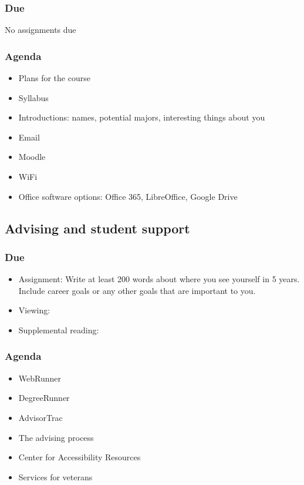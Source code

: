 \documentclass[12pt,article,oneside]{memoir}
\begin{document}
\subsubsection{Due}
No assignments due

\subsubsection{Agenda}
\begin{itemize}
 \item Plans for the course
 \item Syllabus
 \item Introductions: names, potential majors, interesting things about you
 \item Email
 \item Moodle
 \item WiFi
 \item Office software options: Office 365, LibreOffice, Google Drive
\end{itemize}


\subsection{Advising and student support}
\subsubsection{Due}
\begin{itemize}
 \item Assignment: Write at least 200 words about where you see yourself in 5 years.  Include career goals or any other goals that are important to you.
 \item Viewing: \cite{credits}
 \item Supplemental reading: 
\end{itemize}

\subsubsection{Agenda}
\begin{itemize}
\item WebRunner
\item DegreeRunner
\item AdvisorTrac
\item The advising process
\item Center for Accessibility Resources
\item Services for veterans

\end{itemize} 
\end{document}
